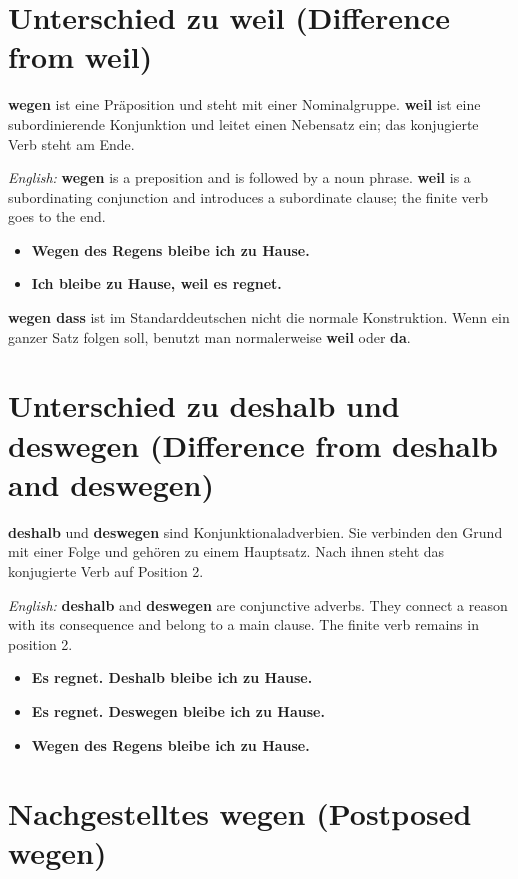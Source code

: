 \documentclass[a4paper]{article}
\begin{document}
   \section{Unterschied zu weil \textnormal{(Difference from weil)}}

   \textbf{wegen} ist eine Präposition und steht mit einer Nominalgruppe. \textbf{weil} ist eine subordinierende Konjunktion und leitet einen Nebensatz ein; das konjugierte Verb steht am Ende.

   \textit{English:} \textbf{wegen} is a preposition and is followed by a noun phrase. \textbf{weil} is a subordinating conjunction and introduces a subordinate clause; the finite verb goes to the end.

   \begin{itemize}
      \item \textbf{Wegen des Regens bleibe ich zu Hause.}
      \item \textbf{Ich bleibe zu Hause, weil es regnet.}
   \end{itemize}

   \textbf{wegen dass} ist im Standarddeutschen nicht die normale Konstruktion. Wenn ein ganzer Satz folgen soll, benutzt man normalerweise \textbf{weil} oder \textbf{da}.

   \section{Unterschied zu deshalb und deswegen \textnormal{(Difference from deshalb and deswegen)}}

   \textbf{deshalb} und \textbf{deswegen} sind Konjunktionaladverbien. Sie verbinden den Grund mit einer Folge und gehören zu einem Hauptsatz. Nach ihnen steht das konjugierte Verb auf Position 2.

   \textit{English:} \textbf{deshalb} and \textbf{deswegen} are conjunctive adverbs. They connect a reason with its consequence and belong to a main clause. The finite verb remains in position 2.

   \begin{itemize}
      \item \textbf{Es regnet. Deshalb bleibe ich zu Hause.}
      \item \textbf{Es regnet. Deswegen bleibe ich zu Hause.}
      \item \textbf{Wegen des Regens bleibe ich zu Hause.}
   \end{itemize}

   \section{Nachgestelltes wegen \textnormal{(Postposed wegen)}}
\end{document}
